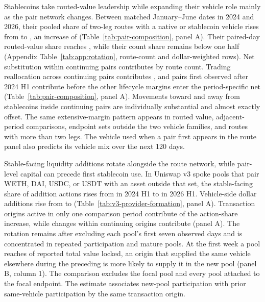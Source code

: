 Stablecoins take routed-value leadership while expanding their vehicle role mainly as the pair network changes. Between matched January--June dates in 2024 and 2026, their pooled share of two-leg routes with a native or stablecoin vehicle rises from \PairPooledBase{} to \PairPooledEnd{}, an increase of \PairPooledTotalLong{} (Table~\ref{tab:pair-composition}, panel A). Their paired-day routed-value share reaches \StableValueEnd{}, while their count share remains below one half (Appendix Table~\ref{tab:app:rotation}, route-count and dollar-weighted rows). Net substitution within continuing pairs contributes \PairPooledWithin{} by route count. Trading reallocation across continuing pairs contributes \PairPooledReweight{}, and pairs first observed after 2024 H1 contribute \PairLifecycleCountEntry{} before the other lifecycle margins enter the period-specific net (Table~\ref{tab:pair-composition}, panel A). Movements toward and away from stablecoins inside continuing pairs are individually substantial and almost exactly offset. The same extensive-margin pattern appears in routed value, adjacent-period comparisons, endpoint sets outside the two vehicle families, and routes with more than two legs. The vehicle used when a pair first appears in the route panel also predicts its vehicle mix over the next 120 days.

Stable-facing liquidity additions rotate alongside the route network, while pair-level capital can precede first stablecoin use. In Uniswap v3 spoke pools that pair WETH, DAI, USDC, or USDT with an asset outside that set, the stable-facing share of addition actions rises from \VThreeLPAddActionBaselineStableShare{} in 2024 H1 to \VThreeLPAddActionComparisonStableShare{} in 2026 H1. Vehicle-side dollar additions rise from \VThreeLPUSDFlowBaselineStableShare{} to \VThreeLPUSDFlowComparisonStableShare{} (Table~\ref{tab:v3-provider-formation}, panel A). Transaction origins active in only one comparison period contribute \VThreeLPAddActionPeriodSpecificOrigins{} of the action-share increase, while changes within continuing origins contribute \VThreeLPAddActionWithinContinuingOrigins{} (panel A). The rotation remains after excluding each pool's first seven observed days and is concentrated in repeated participation and mature pools. At the first week a pool reaches \VThreeLPFormationTVLThreshold{} of reported total value locked, an origin that supplied the same vehicle elsewhere during the preceding \VThreeLPFormationLookback{} is \VThreeLPSameVehicleSupplyEffect{} more likely to supply it in the new pool (panel B, column 1). The comparison excludes the focal pool and every pool attached to the focal endpoint. The estimate associates new-pool participation with prior same-vehicle participation by the same transaction origin.

